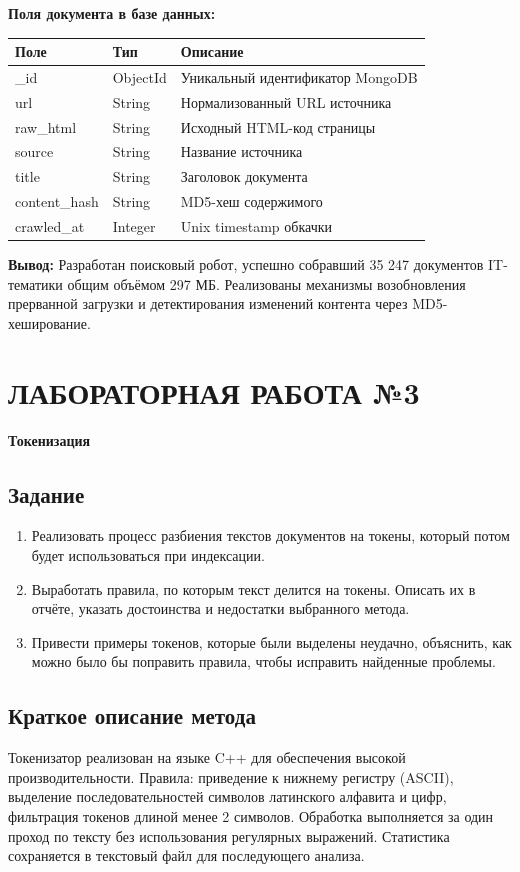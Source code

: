 \documentclass[a4paper, 12pt]{article}
\begin{document}
\textbf{Поля документа в базе данных:}
\begin{table}[h]
\begin{tabular}{|l|l|p{9cm}|}
\hline
\textbf{Поле} & \textbf{Тип} & \textbf{Описание} \\ \hline
\_id & ObjectId & Уникальный идентификатор MongoDB \\ \hline
url & String & Нормализованный URL источника \\ \hline
raw\_html & String & Исходный HTML-код страницы \\ \hline
source & String & Название источника \\ \hline
title & String & Заголовок документа \\ \hline
content\_hash & String & MD5-хеш содержимого \\ \hline
crawled\_at & Integer & Unix timestamp обкачки \\ \hline
\end{tabular}
\end{table}

\textbf{Вывод:} Разработан поисковый робот, успешно собравший 35 247 документов IT-тематики общим объёмом 297 МБ. Реализованы механизмы возобновления прерванной загрузки и детектирования изменений контента через MD5-хеширование.

\newpage

\section*{ЛАБОРАТОРНАЯ РАБОТА №3}
\textbf{Токенизация}

\subsection*{Задание}
\begin{enumerate}
    \item Реализовать процесс разбиения текстов документов на токены, который потом будет использоваться при индексации.
    \item Выработать правила, по которым текст делится на токены. Описать их в отчёте, указать достоинства и недостатки выбранного метода.
    \item Привести примеры токенов, которые были выделены неудачно, объяснить, как можно было бы поправить правила, чтобы исправить найденные проблемы.
\end{enumerate}

\subsection*{Краткое описание метода}
Токенизатор реализован на языке C++ для обеспечения высокой производительности. Правила: приведение к нижнему регистру (ASCII), выделение последовательностей символов латинского алфавита и цифр, фильтрация токенов длиной менее 2 символов. Обработка выполняется за один проход по тексту без использования регулярных выражений. Статистика сохраняется в текстовый файл для последующего анализа.
\end{document}

